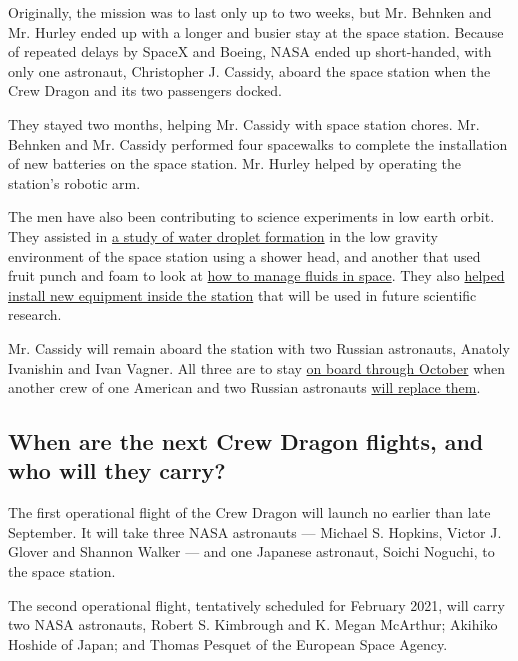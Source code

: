 Originally, the mission was to last only up to two weeks, but Mr.
Behnken and Mr. Hurley ended up with a longer and busier stay at the
space station. Because of repeated delays by SpaceX and Boeing, NASA
ended up short-handed, with only one astronaut, Christopher J. Cassidy,
aboard the space station when the Crew Dragon and its two passengers
docked.

They stayed two months, helping Mr. Cassidy with space station chores.
Mr. Behnken and Mr. Cassidy performed four spacewalks to complete the
installation of new batteries on the space station. Mr. Hurley helped by
operating the station's robotic arm.

The men have also been contributing to science experiments in low earth
orbit. They assisted in
\href{https://www.nasa.gov/mission_pages/station/research/behnken-hurley-science-scrapbook}{a
study of water droplet formation} in the low gravity environment of the
space station using a shower head, and another that used fruit punch and
foam to look at \href{https://www.youtube.com/watch?v=2Dzx6b6vSK4}{how
to manage fluids in space}. They also
\href{https://www.nasa.gov/mission_pages/station/research/behnken-hurley-science-scrapbook}{helped
install new equipment inside the station} that will be used in future
scientific research.

Mr. Cassidy will remain aboard the station with two Russian astronauts,
Anatoly Ivanishin and Ivan Vagner. All three are to stay
\href{https://www.nasa.gov/sites/default/files/atoms/files/exp-63-summary.pdf}{on
board through October} when another crew of one American and two Russian
astronauts
\href{https://www.nasa.gov/press-release/nasa-astronaut-kate-rubins-crewmates-to-discuss-upcoming-spaceflight}{will
replace them}.

\hypertarget{when-are-the-next-crew-dragon-flights-and-who-will-they-carry}{%
\subsection{When are the next Crew Dragon flights, and who will they
carry?}\label{when-are-the-next-crew-dragon-flights-and-who-will-they-carry}}

The first operational flight of the Crew Dragon will launch no earlier
than late September. It will take three NASA astronauts --- Michael S.
Hopkins, Victor J. Glover and Shannon Walker --- and one Japanese
astronaut, Soichi Noguchi, to the space station.

The second operational flight, tentatively scheduled for February 2021,
will carry two NASA astronauts, Robert S. Kimbrough and K. Megan
McArthur; Akihiko Hoshide of Japan; and Thomas Pesquet of the European
Space Agency.

